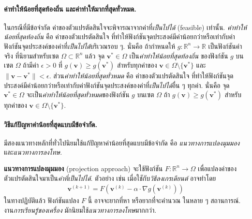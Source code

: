 \paragraph{ค่าทำให้น้อยที่สุดท้องถิ่น และค่าทำให้มากที่สุดทั่วหมด.}
ในกรณีที่มีข้อจำกัด ค่าของตัวแปรตัดสินใจจะพิจารณาจากค่าที่\textit{เป็นไปได้} (feasible) เท่านั้น.
\textit{ค่าทำให้น้อยที่สุดท้องถิ่น}
คือ ค่าของตัวแปรตัดสินใจ ที่ทำให้ฟังก์ชันจุดประสงค์มีค่าน้อยกว่าหรือเท่ากับค่าฟังก์ชันจุดประสงค์ของค่าที่\textit{เป็นไปได้}บริเวณรอบ ๆ.
นั่นคือ
ถ้ากำหนดให้ $g: \mathbb{R}^n \rightarrow \mathbb{R}$ เป็นฟังก์ชันค่าจริง 
ที่นิยามสำหรับเซต $\Omega \subset \mathbb{R}^n$
แล้ว จุด $\bm{v}^\ast \in \Omega$ เป็น\textit{ค่าทำให้น้อยที่สุดท้องถิ่น} ของฟังก์ชัน $g$ บนเซต $\Omega$ ถ้ามีค่า $\epsilon > 0$ ที่ $g(\bm{v}) \geq g(\bm{v}^\ast)$ สำหรับทุกค่าของ $\bm{v} \in \Omega \setminus \{ \bm{v}^\ast \}$
และ $\|\bm{v} - \bm{v}^\ast\| < \epsilon$.
ส่วน\textit{ค่าทำให้น้อยที่สุดทั่วหมด}
คือ ค่าของตัวแปรตัดสินใจ ที่ทำให้ฟังก์ชันจุดประสงค์มีค่าน้อยกว่าหรือเท่ากับค่าฟังก์ชันจุดประสงค์ของค่าที่\textit{เป็นไปได้}อื่น ๆ ทุกค่า.
นั่นคือ
จุด $\bm{v}^\ast \in \Omega$ จะเป็น\textit{ค่าทำให้น้อยที่สุดทั่วหมด}ของฟังก์ชัน $g$ บนเซต $\Omega$ ถ้า $g(\bm{v}) \geq g(\bm{v}^\ast)$ สำหรับ ทุกค่าของ $\bm{v} \in \Omega \setminus \{ \bm{v}^\ast \}$.

\paragraph{วิธีแก้ปัญหาค่าน้อยที่สุดแบบมีข้อจำกัด.}
มีสองแนวทางหลักที่ทั่วไปนิยมใช้แก้ปัญหาค่าน้อยที่สุดแบบมีข้อจำกัด คือ
\textit{แนวทางการแปลงมุมมอง}
และ\textit{แนวทางการลงโทษ}.

\textbf{แนวทางการแปลงมุมมอง} (projection approach)
จะใช้ฟังก์ชัน $F: \mathbb{R}^n \rightarrow \Omega$ เพื่อแปลงค่าของตัวแปรตัดสินใจมาเป็น\textit{ค่าที่เป็นไปได้}.
ตัวอย่าง เช่น เมื่อใชักับ\textit{วิธีลงเกรเดียนต์} อาจทำโดย
\begin{eqnarray}
\bm{v}^{(k+1)} = F \left( \bm{v}^{(k)} - \alpha \cdot \nabla g(\bm{v}^{(k)}) \right)
\label{eq: opt const projection} 
\end{eqnarray}
ในทางปฏิบัติแล้ว 
ฟังก์ชันแปลง $F$ นี้
อาจจะยากที่หา หรือยากที่จะคำนวณ
ในหลาย ๆ สถานการณ์.
งาน\textit{การเรียนรู้ของเครื่อง} มักนิยมใช้\textit{แนวทางการลงโทษ}มากกว่า.

